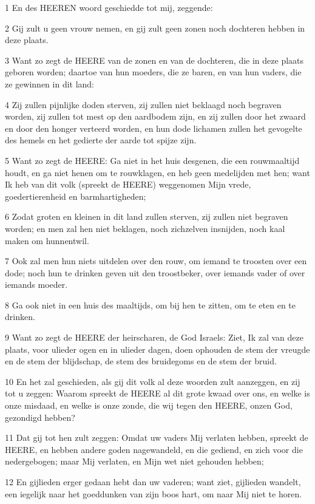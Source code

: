 \par 1 En des HEEREN woord geschiedde tot mij, zeggende:
\par 2 Gij zult u geen vrouw nemen, en gij zult geen zonen noch dochteren hebben in deze plaats.
\par 3 Want zo zegt de HEERE van de zonen en van de dochteren, die in deze plaats geboren worden; daartoe van hun moeders, die ze baren, en van hun vaders, die ze gewinnen in dit land:
\par 4 Zij zullen pijnlijke doden sterven, zij zullen niet beklaagd noch begraven worden, zij zullen tot mest op den aardbodem zijn, en zij zullen door het zwaard en door den honger verteerd worden, en hun dode lichamen zullen het gevogelte des hemels en het gedierte der aarde tot spijze zijn.
\par 5 Want zo zegt de HEERE: Ga niet in het huis desgenen, die een rouwmaaltijd houdt, en ga niet henen om te rouwklagen, en heb geen medelijden met hen; want Ik heb van dit volk (spreekt de HEERE) weggenomen Mijn vrede, goedertierenheid en barmhartigheden;
\par 6 Zodat groten en kleinen in dit land zullen sterven, zij zullen niet begraven worden; en men zal hen niet beklagen, noch zichzelven insnijden, noch kaal maken om hunnentwil.
\par 7 Ook zal men hun niets uitdelen over den rouw, om iemand te troosten over een dode; noch hun te drinken geven uit den troostbeker, over iemands vader of over iemands moeder.
\par 8 Ga ook niet in een huis des maaltijds, om bij hen te zitten, om te eten en te drinken.
\par 9 Want zo zegt de HEERE der heirscharen, de God Israels: Ziet, Ik zal van deze plaats, voor ulieder ogen en in ulieder dagen, doen ophouden de stem der vreugde en de stem der blijdschap, de stem des bruidegoms en de stem der bruid.
\par 10 En het zal geschieden, als gij dit volk al deze woorden zult aanzeggen, en zij tot u zeggen: Waarom spreekt de HEERE al dit grote kwaad over ons, en welke is onze misdaad, en welke is onze zonde, die wij tegen den HEERE, onzen God, gezondigd hebben?
\par 11 Dat gij tot hen zult zeggen: Omdat uw vaders Mij verlaten hebben, spreekt de HEERE, en hebben andere goden nagewandeld, en die gediend, en zich voor die nedergebogen; maar Mij verlaten, en Mijn wet niet gehouden hebben;
\par 12 En gijlieden erger gedaan hebt dan uw vaderen; want ziet, gijlieden wandelt, een iegelijk naar het goeddunken van zijn boos hart, om naar Mij niet te horen.
